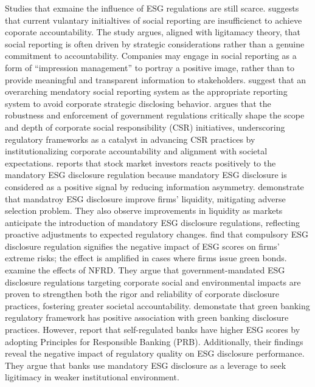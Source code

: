 \documentclass[
  authoryear]{elsarticle}
\begin{document}
Studies that exmaine the influence of ESG regulations are still scarce.
\citet{HESS2007} suggests that current vulantary initialtives of social
reporting are insufficienct to achieve coporate accountability. The
study argues, aligned with ligitamacy theory, that social reporting is
often driven by strategic considerations rather than a genuine
commitment to accountability. Companies may engage in social reporting
as a form of ``impression management'' to portray a positive image,
rather than to provide meaningful and transparent information to
stakeholders. \citet{HESS_etal2007} suggest that an overarching
mendatory social reporting system as the appropriate reporting system to
avoid corporate strategic disclosing behavior. \citet{QU2007} argues
that the robustness and enforcement of government regulations critically
shape the scope and depth of corporate social responsibility (CSR)
initiatives, underscoring regulatory frameworks as a catalyst in
advancing CSR practices by institutionalizing corporate accountability
and alignment with societal expectations. \citet{DESAI2024} reports that
stock market investors reacts positively to the mandatory ESG disclosure
regulation because mandatory ESG disclosure is considered as a positive
signal by reducing information asymmetry. \citet{KRUEGER2024}
demonstrate that mandatroy ESG disclosure improve firms' liquidity,
mitigating adverse selection problem. They also observe improvements in
liquidity as markets anticipate the introduction of mandatory ESG
disclosure regulations, reflecting proactive adjustments to expected
regulatory changes. \citet{LEE2024} find that compulsory ESG disclosure
regulation signifies the negative impact of ESG scores on firms' extreme
risks; the effect is amplified in cases where firms issue green bonds.
\citet{CICCHIELLO2023} examine the effects of NFRD. They argue that
government-mandated ESG disclosure regulations targeting corporate
social and environmental impacts are proven to strengthen both the rigor
and reliability of corporate disclosure practices, fostering greater
societal accountability. \citet{BOSE2018} demonstate that green banking
regulatory framework has positive association with green banking
disclosure practices. However, \citet{MANOS2024} report that
self-regulated banks have higher ESG scores by adopting Principles for
Responsible Banking (PRB). Additionally, their findings reveal the
negative impact of regulatory quality on ESG disclosure performance.
They argue that banks use mandatory ESG disclosure as a leverage to seek
ligitimacy in weaker institutional environment.
\end{document}
